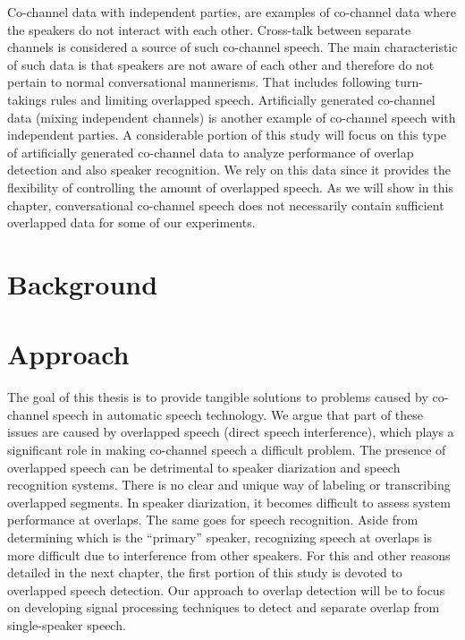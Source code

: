 Co-channel data with independent parties, are examples of co-channel data where the speakers do not interact with each other. 
Cross-talk between separate channels is considered a source of such co-channel speech. 
The main characteristic of such data is that speakers are not aware of each other and therefore do not pertain to normal conversational mannerisms. 
That includes following turn-takings rules and limiting overlapped speech. 
Artificially generated co-channel data (mixing independent channels) is another example of co-channel speech with independent parties. 
A considerable portion of this study will focus on this type of artificially generated co-channel data to analyze performance of overlap detection and also speaker recognition. 
We rely on this data since it provides the flexibility of controlling the amount of overlapped speech. 
As we will show in this chapter, conversational co-channel speech does not necessarily contain sufficient overlapped data for some of our experiments. 

\section{Background}
\label{sec:background}



\section{Approach}

The goal of this thesis is to provide tangible solutions to problems caused by co-channel speech in automatic speech technology. 
We argue that part of these issues are caused by overlapped speech (direct speech interference), which plays a significant role in making co-channel speech a difficult problem. 
The presence of overlapped speech can be detrimental to speaker diarization and speech recognition systems. 
There is no clear and unique way of labeling or transcribing overlapped segments. 
In speaker diarization, it becomes difficult to assess system performance at overlaps. 
The same goes for speech recognition. 
Aside from determining which is the ``primary'' speaker, recognizing speech at overlaps is more difficult due to interference from other speakers. 
For this and other reasons detailed in the next chapter, the first portion of this study is devoted to overlapped speech detection. 
Our approach to overlap detection will be to focus on developing signal processing techniques to detect and separate overlap from single-speaker speech. 

